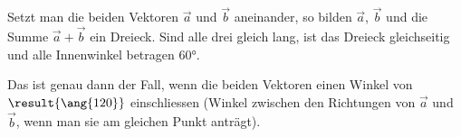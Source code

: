 \begin{center}
\end{center}

Setzt man die beiden Vektoren $\vec a$ und $\vec b$ aneinander, so bilden $\vec a$, $\vec b$ und die Summe $\vec a + \vec b$ ein Dreieck. Sind alle drei gleich lang, ist das Dreieck gleichseitig und alle Innenwinkel betragen $\ang{60}$.

Das ist genau dann der Fall, wenn die beiden Vektoren einen Winkel von $\result{\ang{120}}$ einschliessen (Winkel zwischen den Richtungen von $\vec a$ und $\vec b$, wenn man sie am gleichen Punkt anträgt).
